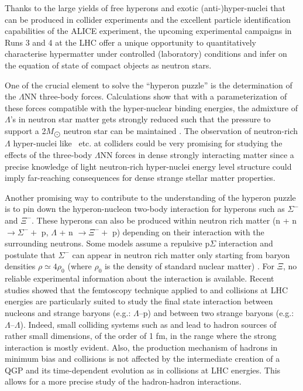 Thanks to the large yields of free hyperons and  exotic (anti-)hyper-nuclei that can be produced in collider experiments and the excellent particle identification capabilities of the ALICE experiment, the upcoming experimental campaigns in Runs 3 and 4 at the LHC offer a unique opportunity to quantitatively characterise hypermatter under controlled (laboratory) conditions and infer on the equation of state of compact objects as neutron stars.

One of the crucial  element to solve the ``hyperon puzzle'' is the determination of the $\Lambda$NN three-body forces. 
Calculations show that with a parameterization of these forces compatible with the hyper-nuclear binding energies, the admixture of $\Lambda$'s in neutron star matter gets strongly reduced such that the pressure to support a 2$M_{\bigodot}$ neutron star can be maintained \cite{Lonardoni:2014bwa}. 
The observation of neutron-rich $\Lambda$ hyper-nuclei like \hypfour\ etc. at colliders could be very promising for studying the effects of the
three-body $\Lambda$NN forces in dense strongly interacting matter since a precise knowledge of light neutron-rich hyper-nuclei energy level structure could imply far-reaching consequences for  dense strange stellar matter properties.

Another promising way to contribute to the understanding of the hyperon puzzle is to pin down the hyperon-nucleon two-body interaction
for hyperons such as $\Sigma^{-}$ and $\Xi^-$. These hyperons can also be produced within neutron rich matter 
(n + n $\rightarrow \Sigma^- +$ p, $\Lambda$ + n $\rightarrow \Xi^- +$ p) depending on their interaction with the surrounding neutrons.
Some models assume a repulsive p$\Sigma$ interaction and postulate that $\Sigma^{-}$ can appear in neutron rich matter only starting from baryon densities $\rho \simeq 4\rho_{0}$ (where $\rho_{0}$ is the density of standard nuclear matter) \cite{PRC-93-035808-2016}.
For $\Xi$, no reliable experimental information about the interaction is available.
Recent studies \cite{Acharya:2018gyz} showed that the femtoscopy technique applied to \pp and \pPb collisions at LHC energies are particularly suited to study the final state interaction between nucleons and strange baryons (e.g.: $\Lambda$--p) and between two strange baryons (e.g.: $\Lambda$--$\Lambda$). 
Indeed, small colliding systems such as \pp and \pPb lead to hadron sources of rather small dimensions, of the order of 1 fm, in the range where the strong interaction is mostly evident.
Also, the production mechanism of hadrons in minimum bias \pp and \pPb collisions is not affected by the intermediate creation of a QGP and its time-dependent evolution as in \PbPb collisions at LHC energies. This allows for a more precise study of the hadron-hadron interactions.

